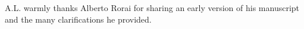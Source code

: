 \documentclass[numberedappendix]{emulateapj}
\begin{document}
\begin{acknowledgements}
A.L. warmly thanks Alberto Rorai for sharing an early version of his manuscript and the many clarifications he provided.
\end{acknowledgements}




\end{document}
